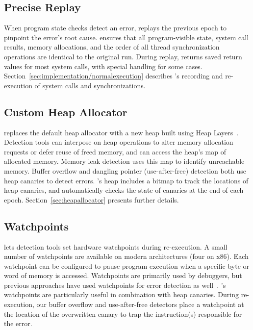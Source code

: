 \subsection{Precise Replay}

When program state checks detect an error, \doubletake{} replays the previous epoch to pinpoint the error's root cause. \doubletake{} ensures that all program-visible state, system call results, memory allocations, and the order of all thread synchronization operations are identical to the original run. During replay, \doubletake{} returns saved return values for most system calls, with special handling for some cases. Section~\ref{sec:implementation/normalexecution} describes \doubletake{}'s recording and re-execution of system calls and synchronizations.

\subsection{Custom Heap Allocator}

\doubletake{} replaces the default heap allocator with a new heap built using Heap Layers~\cite{heaplayers}. Detection tools can interpose on heap operations to alter memory allocation requests or defer reuse of freed memory, and can access the heap's map of allocated memory. Memory leak detection uses this map to identify unreachable memory. Buffer overflow and dangling pointer (use-after-free) detection both use heap canaries to detect errors. \doubletake{}'s heap includes a bitmap to track the locations of heap canaries, and automatically checks the state of canaries at the end of each epoch. Section~\ref{sec:heapallocator} presents further details.

\subsection{Watchpoints}

\doubletake{} lets detection tools set hardware watchpoints during re-execution. A small number of watchpoints are available on modern architectures (four on x86). Each watchpoint can be configured to pause program execution when a specific byte or word of memory is accessed. Watchpoints are primarily used by debuggers, but previous approaches have used watchpoints for error detection as well~\cite{Kivati,fastboundschecking}. \doubletake{}'s watchpoints are particularly useful in combination with heap canaries. During re-execution, our buffer overflow and use-after-free detectors place a watchpoint at the location of the overwritten canary to trap the instruction(s) responsible for the error.
